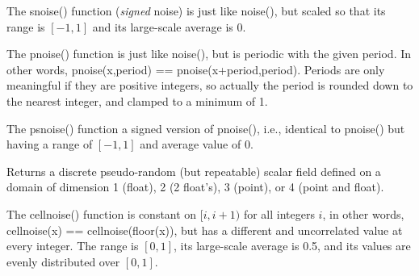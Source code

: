 \documentclass[11pt,letterpaper]{book}
\def\float{{\cf float}\xspace}
\def\point{{\cf point}\xspace}
\def\noise{{\cf noise()}\xspace}
\def\snoise{{\cf snoise()}\xspace}
\def\pnoise{{\cf pnoise()}\xspace}
\def\psnoise{{\cf psnoise()}\xspace}
\def\cellnoise{{\cf cellnoise()}\xspace}
\begin{document}
The \snoise function (\emph{signed} noise) is just like
\noise, but scaled so that its range is $[-1,1]$ and its large-scale
average is 0.
\apiend

The \pnoise function is just like \noise, but is periodic with the given
period.  In other words, {\cf pnoise(x,period) == pnoise(x+period,period)}.
Periods are only meaningful if they are positive integers, so actually
the period is rounded down to the nearest integer, and clamped to a
minimum of 1.

The \psnoise function a signed version of \pnoise, i.e., identical to
\pnoise but having a range of $[-1,1]$ and average value of 0.
\apiend

Returns a discrete pseudo-random (but repeatable) scalar field
defined on a domain of dimension 1 (\float), 2 (2 \float's), 3 (\point),
or 4 (\point and \float).  

The \cellnoise function is constant on $[i,i+1)$ for all
integers $i$, in other words, {\cf cellnoise(x) == cellnoise(floor(x))},
but has a different and uncorrelated value at every integer.  The range
is $[0,1]$, its large-scale average is 0.5, and its values are evenly
distributed over $[0,1]$.
\end{document}
